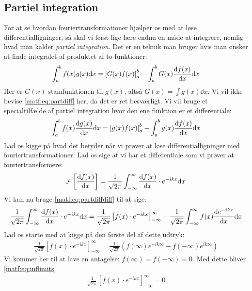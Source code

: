 \documentclass[crop=false, class=memoir]{standalone}
\begin{document}
\subsection{Partiel integration}

For at se hvordan fouriertransformationer hjælper os med at løse differentialligninger, så skal vi først lige lære endnu en måde at integrere, nemlig hvad man kalder \emph{partiel integration}. Det er en teknik man bruger hvis man ønsker at finde integralet af produktet af to funktioner:
\begin{align}
    \int_a^b f(x) g(x) \dd x = \left[G(x) f(x)\right]_a^b - \int_a^b G(x) \dv{f(x)}{x} \dd x
    \label{matf:eq:partdiff}
\end{align}
Her er $G(x)$ stamfunktionen til $g(x)$, altså $G(x) = \int g(x) \dd x$. Vi vil ikke bevise \cref{matf:eq:partdiff} her, da det er ret besværligt. Vi vil bruge et specialtilfælde af partiel integration hvor den ene funktion er et differentiale:
\begin{align}
    \int_a^b f(x) \dv{g(x)}{x} \dd x = \left[g(x) f(x)\right]_a^b - \int_a^b g(x) \dv{f(x)}{x} \dd x
    \label{matf:eq:partdiffdiff}
\end{align}
Lad os kigge på hvad det betyder når vi prøver at løse differentialligninger med fouriertransformationer. Lad os sige at vi har et differentiale som vi prøver at fouriertransformere:
\begin{align}
    \mathcal{F}\left[ \dv{f(x)}{x} \right] = \frac{1}{\sqrt{2\pi}} \int_{-\infty}^{\infty} \dv{f(x)}{x}\cdot e^{-ik x} \dd x
\end{align}
Vi kan nu bruge \cref{matf:eq:partdiffdiff} til at sige:
\begin{align}
    \frac{1}{\sqrt{2\pi}} \int_{-\infty}^{\infty} \dv{f(x)}{x}\cdot e^{-ik x} \dd x = \frac{1}{\sqrt{2\pi}}\left[ f(x) \cdot e^{-ik x}\right]_{-\infty}^{\infty} - \frac{1}{\sqrt{2\pi}}\int_{-\infty}^{\infty}f(x) \dv{e^{-ik x}}{x} \dd x
    \label{matf:eq:partfour}
\end{align}
Lad os starte med at kigge på den første del af dette udtryk:
\begin{align}
    \frac{1}{\sqrt{2\pi}}\left[ f(x) \cdot e^{-ik x}\right]_{-\infty}^{\infty} = \frac{1}{\sqrt{2\pi}}\left( f(\infty)e^{-ik \infty} - f(-\infty)e^{ik \infty} \right)
    \label{matf:eq:inflimits}
\end{align}
Vi kommer her til at lave en antagelse: $f(\infty) = f(-\infty) = 0$. Med dette bliver \cref{matf:eq:inflimits}
\begin{align}
    \frac{1}{\sqrt{2\pi}}\left[ f(x) \cdot e^{-ik x}\right]_{-\infty}^{\infty} = 0
\end{align}
\end{document}
